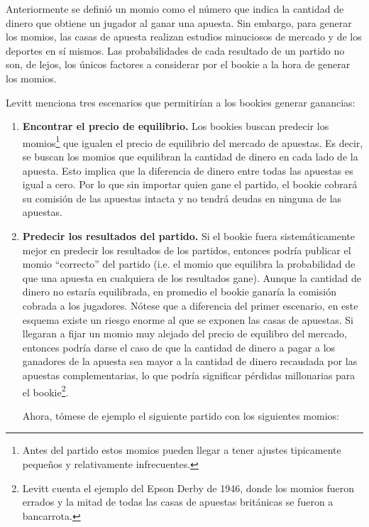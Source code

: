 Anteriormente se definió un momio como el número que indica la cantidad de dinero que obtiene un jugador al ganar una apuesta. Sin embargo, para generar los momios, las casas de apuesta realizan estudios minuciosos de mercado y de los deportes en sí mismos. Las probabilidades de cada resultado de un partido no son, de lejos, los únicos factores a considerar por el bookie a la hora de generar los momios.  

Levitt \cite{levitt2004gambling} menciona tres escenarios que permitirían a los bookies generar ganancias:
 \begin{enumerate}
  \item \textbf{Encontrar el precio de equilibrio.} Los bookies buscan predecir los momios\footnote{Antes del partido estos momios pueden llegar a tener ajustes tipicamente pequeños y relativamente infrecuentes.} que igualen el precio de equilibrio del mercado de apuestas. Es decir, se buscan los momios que equilibran la cantidad de dinero en cada lado de la apuesta. Esto implica que la diferencia de dinero entre todas las apuestas es igual a cero. Por lo que sin importar quien gane el partido, el bookie cobrará su comisión de las apuestas intacta y no tendrá deudas en ninguna de las apuestas.
  
  \item \textbf{Predecir los resultados del partido.} Si el bookie fuera sistemáticamente mejor en predecir los resultados de los partidos, entonces podría publicar el momio ``correcto'' del partido (i.e. el momio que equilibra la probabilidad de que una apuesta en cualquiera de los resultados gane). Aunque la cantidad de dinero no estaría equilibrada, en promedio el bookie ganaría la comisión cobrada a los jugadores. Nótese que a diferencia del primer escenario, en este esquema existe un riesgo enorme al que se exponen las casas de apuestas. Si llegaran a fijar un momio muy alejado del precio de equilibro del mercado, entonces podría darse el caso de que la cantidad de dinero a pagar a los ganadores de la apuesta sea mayor a la cantidad de dinero recaudada por las apuestas complementarias, lo que podría significar pérdidas millonarias para el bookie\footnote{Levitt \cite{levitt2004gambling} cuenta el ejemplo del Epson Derby de 1946, donde los momios fueron errados y la mitad de todas las casas de apuestas británicas se fueron a bancarrota.}.

 Ahora, tómese de ejemplo el siguiente partido con los siguientes momios:
 \begin{itemize}


\end{itemize}
\end{enumerate}
